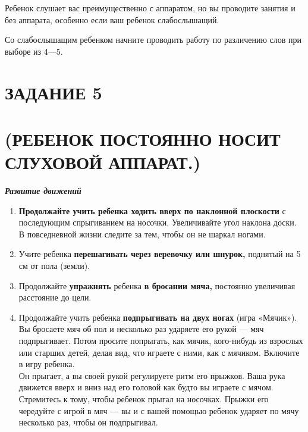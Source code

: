 \documentclass{book}
\renewcommand{\emph}[1]{\textit{#1}}
\begin{document}
Ребенок слушает вас преимущественно с аппаратом, но вы проводите занятия
и без аппарата, особенно если ваш ребенок слабослышащий.

Со слабослышащим ребенком начните проводить работу по различению слов
при выборе из 4---5.

\section{ЗАДАНИЕ 5}\section*{(РЕБЕНОК ПОСТОЯННО НОСИТ СЛУХОВОЙ АППАРАТ.)}

\emph{\textbf{Развитие движений}}


\begin{enumerate}
\def\labelenumi{\arabic{enumi}.}
\item
  
  \textbf{Продолжайте учить ребенка ходить вверх по наклонной плоскости}
  с последующим спрыгиванием на носочки. Увеличивайте угол наклона
  доски. В повседневной жизни следите за тем, чтобы он не шаркал ногами.
  
\item
  
  Учите ребенка \textbf{перешагивать через веревочку или шнурок,}
  поднятый на 5 см от пола (земли).
  
\item
  
  Продолжайте \textbf{упражнять} ребенка \textbf{в бросании мяча,}
  постоянно увеличивая расстояние до цели.
  
\item
  
  Продолжайте учить ребенка \textbf{подпрыгивать на двух ногах} (игра
  «Мячик»). Вы бросаете мяч об пол и несколько раз ударяете его рукой
  --- мяч подпрыгивает. Потом просите попрыгать, как мячик, кого-нибудь
  из взрослых или старших детей, делая вид, что играете с ними, как с
  мячиком. Включите в игру ребенка.\\
  Он прыгает, а вы своей рукой регулируете ритм его прыжков. Ваша рука
  движется вверх и вниз над его головой как будто вы играете с мячом.
  Стремитесь к тому, чтобы ребенок прыгал на носочках. Прыжки его
  чередуйте с игрой в мяч --- вы и с вашей помощью ребенок ударяет по
  мячу несколько раз, чтобы он подпрыгивал.
  
\end{enumerate}
\end{document}
